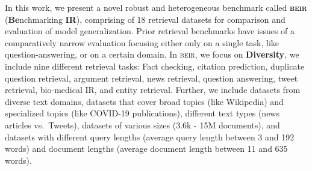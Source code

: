 \documentclass{article}
\newcommand{\custo}[1]{\textsc{\normalsize #1}}
\newcommand{\beir}{\custo{beir}\xspace}
\begin{document}
In this work, we present a novel robust and heterogeneous benchmark called \textbf{\beir} (\textbf{Be}nchmarking \textbf{IR}), comprising of 18 retrieval datasets for comparison and evaluation of model generalization. 
Prior retrieval benchmarks \citep{guo2020multireqa, petroni2020kilt} have issues of a comparatively narrow evaluation focusing either only on a single task, like question-answering, or on a certain domain. In \beir, we focus on \textbf{Diversity}, we include nine different retrieval tasks: Fact checking, citation prediction, duplicate question retrieval, argument retrieval, news retrieval, question answering, tweet retrieval, bio-medical IR, and entity retrieval. Further, we include datasets from diverse text domains, datasets that cover broad topics (like Wikipedia) and specialized topics (like COVID-19 publications), different text types (news articles vs.\ Tweets), datasets of various sizes (3.6k - 15M documents), and datasets with different query lengths (average query length between 3 and 192 words) and document lengths (average document length between 11 and 635 words).


\end{document}

